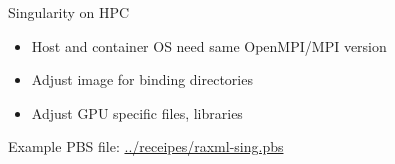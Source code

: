 \documentclass{beamer}
\begin{document}
  \begin{frame}{Singularity on HPC}
    \begin{itemize}
      \item Host and container OS need same OpenMPI/MPI version
      \item Adjust image for binding directories
      \item Adjust GPU specific files, libraries
    \end{itemize}
    Example PBS file: \url{../receipes/raxml-sing.pbs}
  \end{frame}
\end{document}
